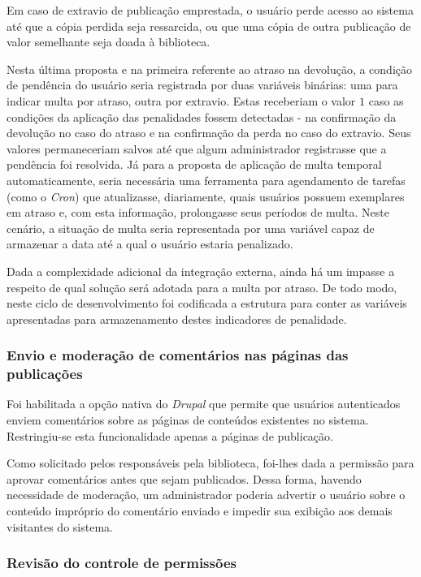 \documentclass[a4paper]{article}
\begin{document}
Em caso de extravio de publicação emprestada, o usuário perde acesso ao sistema até que a cópia perdida seja ressarcida, ou que uma cópia de outra publicação de valor semelhante seja doada à biblioteca.

Nesta última proposta e na primeira referente ao atraso na devolução, a condição de pendência do usuário seria registrada por duas variáveis binárias: uma para indicar multa por atraso, outra por extravio. Estas receberiam o valor $1$ caso as condições da aplicação das penalidades fossem detectadas - na confirmação da devolução no caso do atraso e na confirmação da perda no caso do extravio. Seus valores permaneceriam salvos até que algum administrador registrasse que a pendência foi resolvida. Já para a proposta de aplicação de multa temporal automaticamente, seria necessária uma ferramenta para agendamento de tarefas (como o \textit{Cron}) que atualizasse, diariamente, quais usuários possuem exemplares em atraso e, com esta informação, prolongasse seus períodos de multa. Neste cenário, a situação de multa seria representada por uma variável capaz de armazenar a data até a qual o usuário estaria penalizado.

Dada a complexidade adicional da integração externa, ainda há um impasse a respeito de qual solução será adotada para a multa por atraso. De todo modo, neste ciclo de desenvolvimento foi codificada a estrutura para conter as variáveis apresentadas para armazenamento destes indicadores de penalidade.

\subsubsection{Envio e moderação de comentários nas páginas das publicações}

Foi habilitada a opção nativa do \textit{Drupal} que permite que usuários autenticados enviem comentários sobre as páginas de conteúdos existentes no sistema. Restringiu-se esta funcionalidade apenas a páginas de publicação.

Como solicitado pelos responsáveis pela biblioteca, foi-lhes dada a permissão para aprovar comentários antes que sejam publicados. Dessa forma, havendo necessidade de moderação, um administrador poderia advertir o usuário sobre o conteúdo impróprio do comentário enviado e impedir sua exibição aos demais visitantes do sistema.

\subsubsection{Revisão do controle de permissões}
\end{document}
